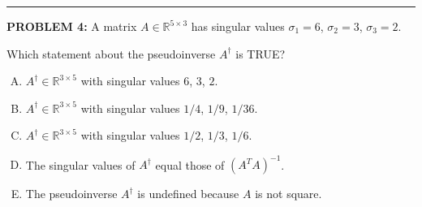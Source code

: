 \documentclass[12pt]{amsart}
\newcommand{\divider}{
  \vspace{-1em} %
  \noindent
  \raisebox{-0.15ex}{\textbullet}%
  \hspace{0.5em}%
  \rule[0.5ex]{0.95\textwidth}{1.0pt}%
  \hspace{0.5em}%
  \raisebox{-0.15ex}{\textbullet}%
  \vspace{0em} %
}
\begin{document}
\divider



\newpage

{\bf PROBLEM 4:}
% 
A matrix $A \in \mathbb{R}^{5 \times 3}$ has singular values $\sigma_1 = 6$, $\sigma_2 = 3$, $\sigma_3 = 2$.

Which statement about the pseudoinverse $A^\dagger$ is TRUE?

\begin{enumerate}[(A)]
\item $A^\dagger \in \mathbb{R}^{3 \times 5}$ with singular values $6$, $3$, $2$.
\item $A^\dagger \in \mathbb{R}^{3 \times 5}$ with singular values $1/4$, $1/9$, $1/36$.
\item $A^\dagger \in \mathbb{R}^{3 \times 5}$ with singular values $1/2$, $1/3$, $1/6$.
\item The singular values of $A^\dagger$ equal those of $(A^TA)^{-1}$.
\item The pseudoinverse $A^\dagger$ is undefined because $A$ is not square.
\end{enumerate}

%
\end{document}
